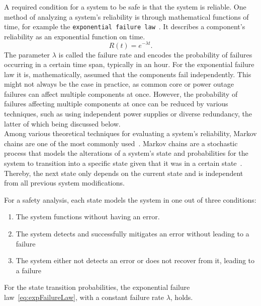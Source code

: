 A required condition for a system to be safe is that the system is reliable.
One method of analyzing a system's reliability is through mathematical functions of time, for example the \texttt{exponential failure law}~\cite{GeffroyMotetDependableComputing}.
It describes a component's reliability as an exponential function on time.
\begin{equation}
R(t) = e^{-\lambda t}.
\label{eq:expFailureLaw}
\end{equation}
The parameter $\lambda$ is called the failure rate and encodes the probability of failures occurring in a certain time span, typically in an hour.
For the exponential failure law it is, mathematically, assumed that the components fail independently.
This might not always be the case in practice, as common core or power outage failures can affect multiple components at once.
However, the probability of failures affecting multiple components at once can be reduced by various techniques, such as using independent power supplies or diverse redundancy, the latter of which being discussed below.
\\

Among various theoretical techniques for evaluating a system's reliability, Markov chains are one of the most commonly used~\cite{BarryFaultToleranceAnalysis}.
Markov chains are a stochastic process that models the alterations of a system's state and probabilities for the system to transition into a specific state given that it was in a certain state~\cite{KemenyMarkovChains}.
Thereby, the next state only depends on the current state and is independent from all previous system modifications.

For a safety analysis, each state models the system in one out of three conditions:
\begin{enumerate}
\item The system functions without having an error.
\item The system detects and successfully mitigates an error without leading to a failure
\item The system either not detects an error or does not recover from it, leading to a failure
\end{enumerate}

For the state transition probabilities, the exponential failure law~\autoref{eq:expFailureLaw}, with a constant failure rate $\lambda$, holds.

